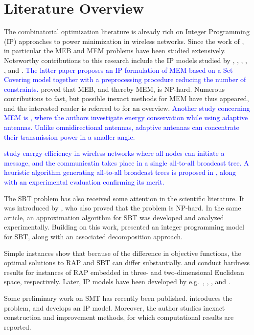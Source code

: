 \section{Literature Overview}
\label{sec:literature}

The combinatorial optimization literature is already rich on Integer Programming (IP) approaches to power minimization in wireless networks.
Since the work of \citet{Wieseltier00onthe}, in particular the MEB and MEM problems have been studied extensively.
Noteworthy contributions to this research include the IP models studied by \citet{das03},
\citet{altinkemer05}, \citet{yuan05}, \citet{yuan08}, \citet{bauer08}, \citet{montemanni11} and \citet{leggieri08}. 
\textcolor{blue}{
The latter paper proposes an IP formulation of MEM based on a Set Covering model together with a preprocessing procedure reducing the number of constraints.}
\citet{cagalj02} proved that MEB, and thereby MEM, is NP-hard.
Numerous contributions to fast, but possible inexact methods for MEM have thus appeared, and the interested reader is referred to \citep{hsiao13} for an overview. 
\textcolor{blue}{Another study concerning MEM is \cite{guo}, where the authors investigate energy conservation while using adaptive antennas. 
Unlike omnidirectional antennas, adaptive antennas can concentrate their transmission power in a smaller angle.}

\textcolor{blue}{\citet{bein10} study energy efficiency in wireless networks where all nodes can initiate a message, and the communicatin takes place in a single all-to-all broadcast tree.
A heuristic algorithm generating all-to-all broadcast trees is proposed in \citet{bhukya14}, along with an experimental evaluation confirming its merit.}

The SBT problem has also received some attention in the scientific literature.
It was introduced by \citet{Papadimitriou06SBT}, who also proved that the problem is NP-hard.
In the same article, an approximation algorithm for SBT was developed and analyzed experimentally.
Building on this work, \citet{Haugland12Dual} presented an integer programming model for SBT, along with an associated decomposition approach.

Simple instances \citep{Haugland12Dual} show that because of the difference in objective functions, the optimal solutions to RAP and SBT can differ substantially.
\citet{kirousis97} and \citet{clementi99} conduct
hardness results for instances of RAP embedded in three- and two-dimensional Euclidean space, respectively.
Later, IP models have been developed by e.g.\ \citet{althaus03}, \citet{montemanni04}, \citet{das05}, and \citet{Haugland11Compact}.

Some preliminary work on SMT has recently been published.
\citet{ivanova16isco} introduces the problem, and develops an IP model.
Moreover, the author studies inexact construction and improvement methods, for which computational results are reported.
